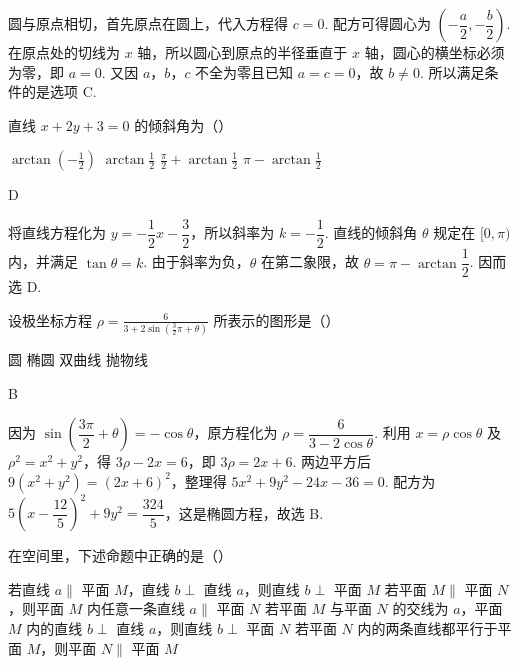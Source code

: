 \begin{solution}
圆与原点相切，首先原点在圆上，代入方程得 \(c=0\). 配方可得圆心为 \(\left(-\dfrac a2,-\dfrac b2\right)\). 在原点处的切线为 \(x\) 轴，所以圆心到原点的半径垂直于 \(x\) 轴，圆心的横坐标必须为零，即 \(a=0\). 又因 \(a\)，\(b\)，\(c\) 不全为零且已知 \(a=c=0\)，故 \(b\neq0\). 所以满足条件的是选项 C.
\end{solution}

\begin{problem}
直线 \(x+2y+3=0\) 的倾斜角为（\quad）

\choices
    {\(\arctan\left(-\frac{1}{2}\right)\)}
    {\(\arctan\frac{1}{2}\)}
    {\(\frac{\pi}{2}+\arctan\frac{1}{2}\)}
    {\(\pi-\arctan\frac{1}{2}\)}
\end{problem}

\begin{answer}
D
\end{answer}

\begin{solution}
将直线方程化为 \(y=-\dfrac12x-\dfrac32\)，所以斜率为 \(k=-\dfrac12\). 直线的倾斜角 \(\theta\) 规定在 \([0,\pi)\) 内，并满足 \(\tan\theta=k\). 由于斜率为负，\(\theta\) 在第二象限，故 \(\theta=\pi-\arctan\dfrac12\). 因而选 D.
\end{solution}

\begin{problem}
设极坐标方程 \(\rho=\frac{6}{3+2\sin\left(\frac{3}{2}\pi+\theta\right)}\) 所表示的图形是（\quad）

\choices
    {圆}
    {椭圆}
    {双曲线}
    {抛物线}
\end{problem}

\begin{answer}
B
\end{answer}

\begin{solution}
因为 \(\sin\left(\dfrac{3\pi}{2}+\theta\right)=-\cos\theta\)，原方程化为 \(\rho=\dfrac{6}{3-2\cos\theta}\). 利用 \(x=\rho\cos\theta\) 及 \(\rho^2=x^2+y^2\)，得 \(3\rho-2x=6\)，即 \(3\rho=2x+6\). 两边平方后
\(9(x^2+y^2)=(2x+6)^2\)，整理得 \(5x^2+9y^2-24x-36=0\). 配方为 \(5\left(x-\dfrac{12}{5}\right)^2+9y^2=\dfrac{324}{5}\)，这是椭圆方程，故选 B.
\end{solution}

\begin{problem}
在空间里，下述命题中正确的是（\quad）

\choices
    {若直线 \(a\parallel\) 平面 \(M\)，直线 \(b\perp\) 直线 \(a\)，则直线 \(b\perp\) 平面 \(M\)}
    {若平面 \(M\parallel\) 平面 \(N\)，则平面 \(M\) 内任意一条直线 \(a\parallel\) 平面 \(N\)}
    {若平面 \(M\) 与平面 \(N\) 的交线为 \(a\)，平面 \(M\) 内的直线 \(b\perp\) 直线 \(a\)，则直线 \(b\perp\) 平面 \(N\)}
    {若平面 \(N\) 内的两条直线都平行于平面 \(M\)，则平面 \(N\parallel\) 平面 \(M\)}
\end{problem}

